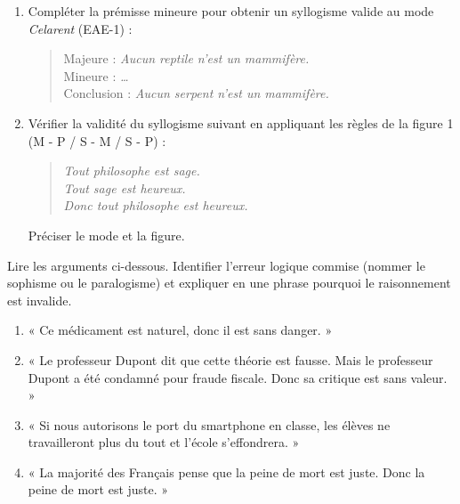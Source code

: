 \documentclass[11pt]{article}
\begin{document}
\begin{exercice}
\begin{enumerate}
    \item Compléter la prémisse mineure pour obtenir un syllogisme valide au mode \textit{Celarent} (EAE-1) :
    \begin{quote}
    Majeure : \textit{Aucun reptile n'est un mammifère.} \\
    Mineure : \textit{\dots} \\
    Conclusion : \textit{Aucun serpent n'est un mammifère.}
    \end{quote}
    \item Vérifier la validité du syllogisme suivant en appliquant les règles de la figure 1 (M - P / S - M / S - P) :
    \begin{quote}
    \textit{Tout philosophe est sage. \\
    Tout sage est heureux. \\
    Donc tout philosophe est heureux.}
    \end{quote}
    Préciser le mode et la figure.
\end{enumerate}
\end{exercice}

\begin{exercice}
Lire les arguments ci-dessous. Identifier l'erreur logique commise (nommer le sophisme ou le paralogisme) et expliquer en une phrase pourquoi le raisonnement est invalide.
\begin{enumerate}
    \item « Ce médicament est naturel, donc il est sans danger. »
    \item « Le professeur Dupont dit que cette théorie est fausse. Mais le professeur Dupont a été condamné pour fraude fiscale. Donc sa critique est sans valeur. »
    \item « Si nous autorisons le port du smartphone en classe, les élèves ne travailleront plus du tout et l'école s'effondrera. »
    \item « La majorité des Français pense que la peine de mort est juste. Donc la peine de mort est juste. »
\end{enumerate}
\end{exercice}
\end{document}
